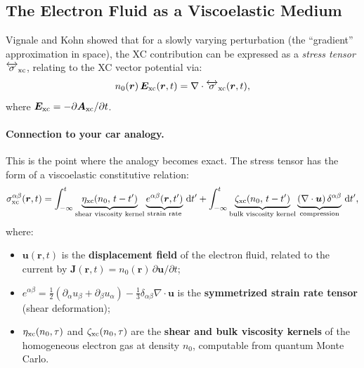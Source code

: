\documentclass[12pt,letterpaper]{article}
\newcommand{\dd}{\mathrm{d}}
\theoremstyle{definition}
\begin{document}
\subsection{The Electron Fluid as a Viscoelastic Medium}

Vignale and Kohn showed that for a slowly varying perturbation (the
``gradient'' approximation in space), the XC contribution can be expressed
as a \emph{stress tensor} $\overleftrightarrow{\sigma}_{\rm xc}$, relating
to the XC vector potential via:
\begin{equation}
  n_0(\bm{r})\,\bm{E}_{\rm xc}(\bm{r},t) = \nabla\cdot\overleftrightarrow{\sigma}_{\rm xc}(\bm{r},t),
  \label{eq:sigma_xc}
\end{equation}
where $\bm{E}_{\rm xc} = -\partial\bm{A}_{\rm xc}/\partial t$.

\paragraph{Connection to your car analogy.}
This is the point where the analogy becomes exact.  The stress tensor has
the form of a viscoelastic constitutive relation:
\begin{equation}
  \sigma_{\rm xc}^{\alpha\beta}(\bm{r},t)
  = \int_{-\infty}^{t}
    \underbrace{\eta_{\rm xc}(n_0,\,t-t')}_{\text{shear viscosity kernel}}
    \underbrace{e^{\alpha\beta}(\bm{r},t')}_{\text{strain rate}}
    \,\dd t'
  + \int_{-\infty}^{t}
    \underbrace{\zeta_{\rm xc}(n_0,\,t-t')}_{\text{bulk viscosity kernel}}
    \underbrace{(\nabla\cdot\bm{u})\,\delta^{\alpha\beta}}_{\text{compression}}
    \,\dd t',
  \label{eq:sigma_vk}
\end{equation}
where:
\begin{itemize}
  \item $\bm{u}(\bm{r},t)$ is the \textbf{displacement field} of the electron
    fluid, related to the current by
    $\bm{J}(\bm{r},t) = n_0(\bm{r})\,\partial\bm{u}/\partial t$;
  \item $e^{\alpha\beta} = \tfrac{1}{2}(\partial_\alpha u_\beta +
    \partial_\beta u_\alpha) - \tfrac{1}{3}\delta_{\alpha\beta}\nabla\cdot\bm{u}$
    is the \textbf{symmetrized strain rate tensor} (shear deformation);
  \item $\eta_{\rm xc}(n_0,\tau)$ and $\zeta_{\rm xc}(n_0,\tau)$ are the
    \textbf{shear and bulk viscosity kernels} of the homogeneous electron gas
    at density $n_0$, computable from quantum Monte Carlo.
\end{itemize}
\end{document}
